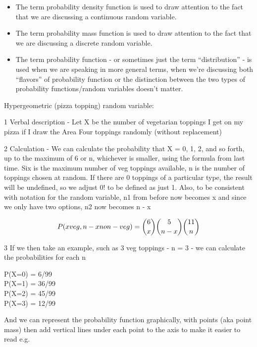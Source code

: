 \documentclass[]{book}
\providecommand{\tightlist}{%
  \setlength{\itemsep}{0pt}\setlength{\parskip}{0pt}}
\theoremstyle{definition}
\theoremstyle{definition}
\theoremstyle{definition}
\theoremstyle{remark}
\begin{document}
\begin{itemize}
\tightlist
\item
  The term probability density function is used to draw attention to the
  fact that we are discussing a continuous random variable.\\
\item
  The term probability mass function is used to draw attention to the
  fact that we are discussing a discrete random variable.\\
\item
  The term probability function - or sometimes just the term
  ``distribution'' - is used when we are speaking in more general terms,
  when we're discussing both ``flavors'' of probability function or the
  distinction between the two types of probability functions/random
  variables doesn't matter.
\end{itemize}

Hypergeometric (pizza topping) random variable:

1 Verbal description - Let X be the number of vegetarian toppings I get
on my pizza if I draw the Area Four toppings randomly (without
replacement)

2 Calculation - We can calculate the probability that X = 0, 1, 2, and
so forth, up to the maximum of 6 or n, whichever is smaller, using the
formula from last time. Six is the maximum number of veg toppings
available, n is the number of toppings chosen at random. If there are 0
toppings of a particular type, the result will be undefined, so we
adjust 0! to be defined as just 1. Also, to be consistent with notation
for the random variable, n1 from before now becomes x and since we only
have two options, n2 now becomes n - x

\[P(x  veg, n - x  non-veg)=  \binom{6}{x} \binom{5}{n - x} \\ \binom{11}{n}\]

3 If we then take an example, such as 3 veg toppings - n = 3 - we can
calculate the probabilities for each n

P(X=0) = 6/99\\
P(X=1) = 36/99\\
P(X=2) = 45/99\\
P(X=3) = 12/99

And we can represent the probability function graphically, with points
(aka point mass) then add vertical lines under each point to the axis to
make it easier to read e.g.
\end{document}
